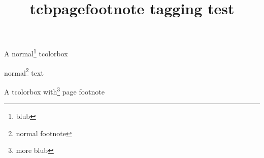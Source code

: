 \documentclass{article}
\title{tcbpagefootnote tagging test}
\begin{document}
\begin{tcolorbox}
A normal\footnote{blub} tcolorbox
\end{tcolorbox}

normal\footnote{normal footnote} text

\begin{tcolorbox}
A tcolorbox with\footnote{more blub} page footnote
\end{tcolorbox}
\end{document}
